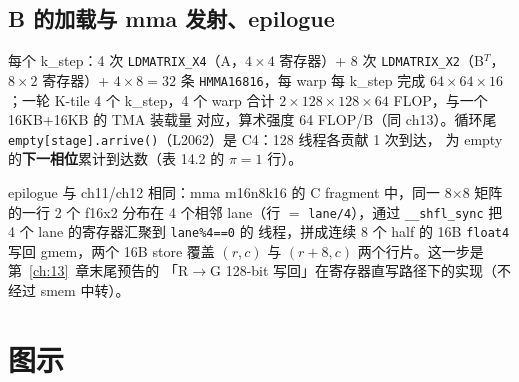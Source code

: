\subsection{B 的加载与 mma 发射、epilogue}



每个 k\_step：4 次 \texttt{LDMATRIX\_X4}（A，$4\times4$ 寄存器）+
8 次 \texttt{LDMATRIX\_X2}（B$^T$，$8\times2$ 寄存器）+
$4 \times 8 = 32$ 条 \texttt{HMMA16816}，每 warp 每 k\_step 完成
$64 \times 64 \times 16$；一轮 K-tile 4 个 k\_step，4 个 warp 合计
$2 \times 128 \times 128 \times 64$ FLOP，与一个 16KB+16KB 的 TMA 装载量
对应，算术强度 64 FLOP/B（同 ch13）。循环尾
\texttt{empty[stage].\allowbreak{}arrive\allowbreak{}()}（L2062）是 C4：128 线程各贡献 1 次到达，
为 empty 的\textbf{下一相位}累计到达数（表 14.2 的 $\pi = 1$ 行）。



epilogue 与 ch11/ch12 相同：mma m16n8k16 的 C fragment 中，同一 8$\times$8
矩阵的一行 2 个 f16x2 分布在 4 个相邻 lane（行 $=$ \texttt{lane/4}），通过
\texttt{\_\_shfl\_sync} 把 4 个 lane 的寄存器汇聚到 \texttt{lane\%4==0} 的
线程，拼成连续 8 个 half 的 16B \texttt{float4} 写回 gmem，两个 16B store
覆盖 $(r, c)$ 与 $(r{+}8, c)$ 两个行片。这一步是第~\ref{ch:13}~章末尾预告的
「R$\to$G 128-bit 写回」在寄存器直写路径下的实现（不经过 smem 中转）。

\needspace{100mm}

\section{图示}

